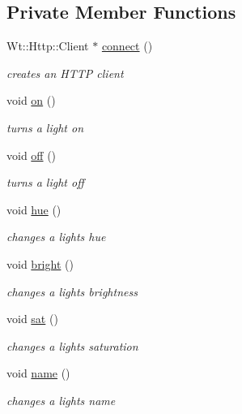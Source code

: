 \subsection*{Private Member Functions}
\begin{DoxyCompactItemize}
\item 
Wt\+::\+Http\+::\+Client $\ast$ \hyperlink{classLightsControlWidget_a4a43f535b11a174e2f9a5b9ffe773557}{connect} ()
\begin{DoxyCompactList}\small\item\em creates an H\+T\+TP client \end{DoxyCompactList}\item 
void \hyperlink{classLightsControlWidget_ad5e2249e08c869e8bd9b190937b93f3c}{on} ()
\begin{DoxyCompactList}\small\item\em turns a light on \end{DoxyCompactList}\item 
void \hyperlink{classLightsControlWidget_a5d39b8ccaa59c8a8f0c8669b45cf0eb2}{off} ()
\begin{DoxyCompactList}\small\item\em turns a light off \end{DoxyCompactList}\item 
void \hyperlink{classLightsControlWidget_a9d7e8c4b0f0549a9a7c3ef96c4d5eef0}{hue} ()
\begin{DoxyCompactList}\small\item\em changes a light\textquotesingle{}s hue \end{DoxyCompactList}\item 
void \hyperlink{classLightsControlWidget_a05224e6a3f891fb29bbf85548aad4684}{bright} ()
\begin{DoxyCompactList}\small\item\em changes a light\textquotesingle{}s brightness \end{DoxyCompactList}\item 
void \hyperlink{classLightsControlWidget_a154f0a2b37fbbd67c920b392086ec60c}{sat} ()
\begin{DoxyCompactList}\small\item\em changes a light\textquotesingle{}s saturation \end{DoxyCompactList}\item 
void \hyperlink{classLightsControlWidget_aa0b663545779e7dd38fa61e456b158ec}{name} ()
\begin{DoxyCompactList}\small\item\em changes a light\textquotesingle{}s name \end{DoxyCompactList}\item 

\end{DoxyCompactItemize}
